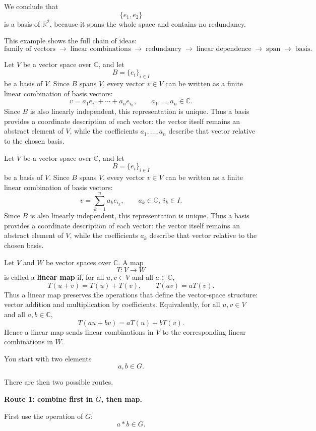 \documentclass[12pt]{article}
\begin{document}
	We conclude that
	\[
	\{e_1,e_2\}
	\]
	is a basis of \(\mathbb{R}^2\), because it spans the whole space and contains no redundancy.
	
	This example shows the full chain of ideas:
	\[
	\text{family of vectors}
	\;\to\;
	\text{linear combinations}
	\;\to\;
	\text{redundancy}
	\;\to\;
	\text{linear dependence}
	\;\to\;
	\text{span}
	\;\to\;
	\text{basis}.
	\]
	
	Let \(V\) be a vector space over \(\mathbb{C}\), and let
	\[
	B=\{e_i\}_{i\in I}
	\]
	be a basis of \(V\). Since \(B\) spans \(V\), every vector \(v\in V\) can be written as a finite linear combination of basis vectors:
	\[
	v=a_1e_{i_1}+\cdots+a_ne_{i_n},
	\qquad a_1,\dots,a_n\in\mathbb{C}.
	\]
	Since \(B\) is also linearly independent, this representation is unique. Thus a basis provides a coordinate description of each vector: the vector itself remains an abstract element of \(V\), while the coefficients \(a_1,\dots,a_n\) describe that vector relative to the chosen basis.
	
	Let \(V\) be a vector space over \(\mathbb{C}\), and let
	\[
	B=\{e_i\}_{i\in I}
	\]
	be a basis of \(V\). Since \(B\) spans \(V\), every vector \(v\in V\) can be written as a finite linear combination of basis vectors:
	\[
	v=\sum_{k=1}^{n} a_k e_{i_k},
	\qquad a_k\in\mathbb{C},\ i_k\in I.
	\]
	Since \(B\) is also linearly independent, this representation is unique. Thus a basis provides a coordinate description of each vector: the vector itself remains an abstract element of \(V\), while the coefficients \(a_k\) describe that vector relative to the chosen basis.
	
	Let \(V\) and \(W\) be vector spaces over \(\mathbb{C}\). A map
	\[
	T:V\to W
	\]
	is called a \textbf{linear map} if, for all \(u,v\in V\) and all \(a\in\mathbb{C}\),
	\[
	T(u+v)=T(u)+T(v),
	\qquad
	T(av)=aT(v).
	\]
	Thus a linear map preserves the operations that define the vector-space structure: vector addition and multiplication by coefficients. Equivalently, for all \(u,v\in V\) and all \(a,b\in\mathbb{C}\),
	\[
	T(au+bv)=aT(u)+bT(v).
	\]
	Hence a linear map sends linear combinations in \(V\) to the corresponding linear combinations in \(W\).
	
	You start with two elements
	\[
	a,b\in G.
	\]
	
	There are then two possible routes.
	
	\medskip
	
	\textbf{Route 1: combine first in \(G\), then map.}
	
	First use the operation of \(G\):
	\[
	a\ast b\in G.
	\]
	
\end{document}
